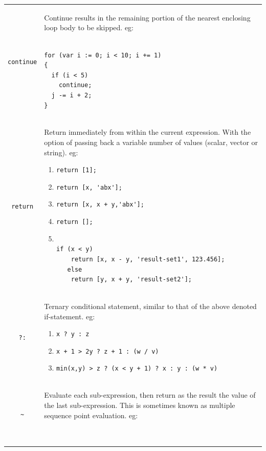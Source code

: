 \documentclass{book}
\begin{document}
{\begin{tabular}{|c|p{}|}
\\
\verb'continue'& Continue results in the remaining portion of the nearest
enclosing loop body to be skipped.
eg:
\begin{verbatim}

for (var i := 0; i < 10; i += 1)  
{                                 
  if (i < 5)                      
    continue;                     
  j -= i + 2;                     
}\end{verbatim}

  \\
\verb'return'& Return immediately from within the current expression.
With the option of passing back a variable number of
values (scalar, vector or string). eg:
\begin{enumerate}
\item\verb"return [1]; "                                     
\item\verb"return [x, 'abx'];"                              
\item\verb"return [x, x + y,'abx'];"                         
\item\verb"return [];"                                       
\item
\begin{verbatim}

if (x < y)                                       
    return [x, x - y, 'result-set1', 123.456];      
   else                                             
    return [y, x + y, 'result-set2'];\end{verbatim}

\end{enumerate}
\\
\verb'?:'& Ternary conditional statement, similar to that of the
above denoted if-statement.                     
eg:
\begin{enumerate}
\item\verb"x ? y : z"                                    
\item\verb"x + 1 > 2y ? z + 1 : (w / v)"                 
\item\verb"min(x,y) > z ? (x < y + 1) ? x : y : (w * v)"
\end{enumerate}
\\
\verb'~'& Evaluate each sub-expression, then return as the result 
the value of the last sub-expression. This is sometimes
known as multiple sequence point evaluation.           
eg:                                                    
\begin{verbatim}


\end{verbatim}
\end{tabular}}
\end{document}
